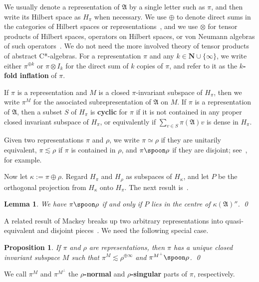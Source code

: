 \documentclass[12pt,a4paper]{article}
\numberwithin{equation}{section}
\newtheorem{lem}[thm]{Lemma}
\newtheorem{prop}[thm]{Proposition}
\theoremstyle{remark}
\newcommand{\bbN}{\mathbf{N}}
\newcommand{\A}{\mathfrak{A}}
\begin{document}
We usually denote a representation of $\A$ by a single letter such as $\pi$, and then write its Hilbert space as $H_\pi$ when necessary.  We use $\oplus$ to denote direct sums in the categories of Hilbert spaces or representations~\cite[Subsec. 2.2.3]{Dix--Cstar}, and we use $\otimes$ for tensor products of Hilbert spaces, operators on Hilbert spaces, or von Neumann algebras of such operators~\cite[Secs. I.2.3--4]{Dix--vN}.  We do not need the more involved theory of tensor products of abstract C*-algebras.  For a representation $\pi$ and any $k\in \bbN\cup\{\infty\}$, we write either $\pi^{\oplus k}$ or $\pi \otimes I_k$ for the direct sum of $k$ copies of $\pi$, and refer to it as the \textbf{$k$-fold inflation} of $\pi$.

If $\pi$ is a representation and $M$ is a closed $\pi$-invariant subspace of $H_\pi$, then we write $\pi^M$ for the associated subrepresentation of $\A$ on $M$.  If $\pi$ is a representation of $\A$, then a subset $S$ of $H_\pi$ is \textbf{cyclic} for $\pi$ if it is not contained in any proper closed invariant subspace of $H_\pi$, or equivalently if $\sum_{v \in S}\pi(\A)v $ is dense in $H_\pi$.

Given two representations $\pi$ and $\rho$, we write $\pi \simeq \rho$ if they are unitarily equivalent, $\pi \lesssim \rho$ if $\pi$ is contained in $\rho$, and $\pi\spoon\rho$ if they are disjoint; see~\cite[Secs. 2.2 and 5.2]{Dix--Cstar}, for example.

Now let $\kappa := \pi \oplus \rho$.  Regard $H_\pi$ and $H_\rho$ as subspaces of $H_\kappa$, and let $P$ be the orthogonal projection from $H_\kappa$ onto $H_\pi$.  The next result is~\cite[Prop. 5.2.4]{Dix--Cstar}.

\begin{lem}\label{lem:central-projection}
We have $\pi \spoon \rho$ if and only if $P$ lies in the centre of $\kappa(\A)''$. \qed
\end{lem}

A related result of Mackey breaks up two arbitrary representations into quasi-equivalent and disjoint pieces~\cite[Thm. 1.11]{Mac76}.  We need the following special case.

\begin{prop}\label{prop:Mac}
If $\pi$ and $\rho$ are representations, then $\pi$ has a unique closed invariant subspace $M$ such that $\pi^M \lesssim \rho^{\oplus \infty}$ and $\pi^{M^\perp} \spoon \rho$. \qed
\end{prop}

We call $\pi^M$ and $\pi^{M^\perp}$ the \textbf{$\rho$-normal} and \textbf{$\rho$-singular} parts of $\pi$, respectively.
\end{document}
